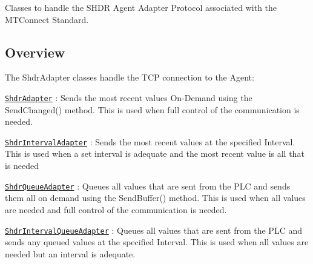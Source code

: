 Classes to handle the S\+H\+DR Agent Adapter Protocol associated with the M\+T\+Connect Standard.

\subsection*{Overview}

The Shdr\+Adapter classes handle the T\+CP connection to the Agent\+:


\begin{DoxyItemize}
\item \href{https://github.com/TrakHound/MTConnect.NET/blob/master/src/MTConnect.NET-SHDR/Adapters/Shdr/ShdrAdapter.cs}{\tt Shdr\+Adapter} \+: Sends the most recent values On-\/\+Demand using the Send\+Changed() method. This is used when full control of the communication is needed.
\item \href{https://github.com/TrakHound/MTConnect.NET/blob/master/src/MTConnect.NET-SHDR/Adapters/Shdr/ShdrIntervalAdapter.cs}{\tt Shdr\+Interval\+Adapter} \+: Sends the most recent values at the specified Interval. This is used when a set interval is adequate and the most recent value is all that is needed
\item \href{https://github.com/TrakHound/MTConnect.NET/blob/master/src/MTConnect.NET-SHDR/Adapters/Shdr/ShdrQueueAdapter.cs}{\tt Shdr\+Queue\+Adapter} \+: Queues all values that are sent from the P\+LC and sends them all on demand using the Send\+Buffer() method. This is used when all values are needed and full control of the communication is needed.
\item \href{https://github.com/TrakHound/MTConnect.NET/blob/master/src/MTConnect.NET-SHDR/Adapters/Shdr/ShdrIntervalQueueAdapter.cs}{\tt Shdr\+Interval\+Queue\+Adapter} \+: Queues all values that are sent from the P\+LC and sends any queued values at the specified Interval. This is used when all values are needed but an interval is adequate.
\end{DoxyItemize}

